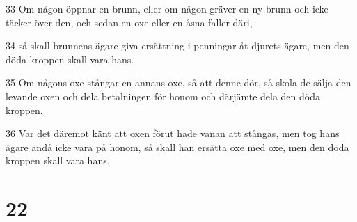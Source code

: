 \par 33 Om någon öppnar en brunn, eller om någon gräver en ny brunn och icke täcker över den, och sedan en oxe eller en åsna faller däri,
\par 34 så skall brunnens ägare giva ersättning i penningar åt djurets ägare, men den döda kroppen skall vara hans.
\par 35 Om någons oxe stångar en annans oxe, så att denne dör, så skola de sälja den levande oxen och dela betalningen för honom och därjämte dela den döda kroppen.
\par 36 Var det däremot känt att oxen förut hade vanan att stångas, men tog hans ägare ändå icke vara på honom, så skall han ersätta oxe med oxe, men den döda kroppen skall vara hans.

\chapter{22}

